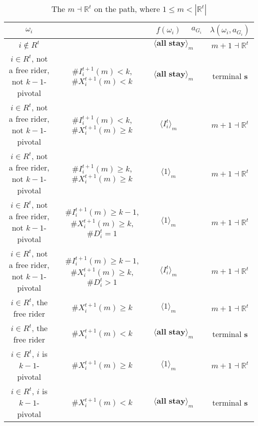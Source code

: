 \documentclass[12pt,letter]{article}
\newcommand{\Omicron}{\mathbb{R}}
\theoremstyle{definition}
\theoremstyle{remark}
\theoremstyle{claim}
\begin{document}
\begin{landscape}
\begin{table}[!htbp]
\caption{The $m\dashv\Omicron^t$ on the path, where $1\leq m < |\Omicron^t|$}
\label{table:eqm_path_ot1}
\begin{center}
\begin{tabular}{c c | c | c | c}
$\omega_i$ 	 & 	   &	$f(\omega_i)$  &	$a_{G_i}$ & $\lambda(\omega_i,a_{G_i})$ \\
\hline
\hline
$i\notin R^t$  	& 								& $\langle \textbf{all stay} \rangle_m$		&  			& $m+1\dashv \Omicron^t$ \\
$i\in R^t$, not a free rider, not $k-1$-pivotal		 	&  $\#I^{t+1}_i(m)< k$, $\#X^{t+1}_i(m)<k$			&  $\langle \textbf{all stay} \rangle_m$	& 	& terminal \textbf{s} \\
$i\in R^t$, not a free rider, not $k-1$-pivotal	  	& $\#I^{t+1}_i(m)<k$, $\#X^{t+1}_i(m)\geq k$		    & $\langle I^t_i \rangle_m$ 		&    			& $m+1\dashv \Omicron^t$ \\
$i\in R^t$, not a free rider, not $k-1$-pivotal	 	&  $\#I^{t+1}_i(m)\geq k$, $\#X^{t+1}_i(m)\geq k$	& $\langle 1 \rangle_m$ 	& 	& $m+1\dashv \Omicron^t$ \\
$i\in R^t$, not a free rider, not $k-1$-pivotal	 	&  $\#I^{t+1}_i(m)\geq k-1$, $\#X^{t+1}_i(m)\geq k$, $\#D^t_i=1$	& $\langle 1 \rangle_m$ 	& 	& $m+1\dashv \Omicron^t$ \\
$i\in R^t$, not a free rider, not $k-1$-pivotal	 	&  $\#I^{t+1}_i(m)\geq k-1$, $\#X^{t+1}_i(m)\geq k$, $\#D^t_i>1$	& $\langle I^t_i \rangle_m$ 	& 	& $m+1\dashv \Omicron^t$ \\
$i\in R^t$, the free rider  	&  $\#X^{t+1}_i(m)\geq k$ & $\langle 1 \rangle_m$ 		& 				  & $m+1\dashv \Omicron^t$ \\
$i\in R^t$, the free rider  	&  		$\#X^{t+1}_i(m)<k$					&  $\langle \textbf{all stay} \rangle_m$		& 										  & terminal \textbf{s} \\
$i\in R^t$, $i$ is $k-1$-pivotal  	&  $\#X^{t+1}_i(m)\geq k$ & $\langle 1 \rangle_m$ 	& 											 & $m+1\dashv \Omicron^t$ \\
$i\in R^t$, $i$ is $k-1$-pivotal  	&  	$\#X^{t+1}_i(m)<k$		&  $\langle \textbf{all stay} \rangle_m$	& 											 & terminal \textbf{s} \\
\hline
\end{tabular}
\end{center}
\end{table}


\end{landscape}
\end{document}
